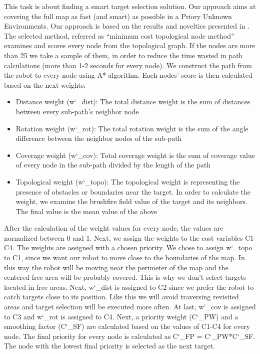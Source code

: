 \documentclass[letterpaper,12pt]{article}
\begin{document}

\vspace{2mm} %

This task is about finding a smart target selection solution. Our approach aims at covering the full map as fast (and smart) as possible in a Priory Unknown Environments. Our approach is based on the results and novelties presented in \cite{tsardoulias}. The selected method, referred as “minimum cost topological node method” examines and scores every node from the topological graph. If the nodes are more than 25 we take a sample of them, in order to reduce the time wasted in path calculations (more than 1-2 seconds for every node). We construct the path from the robot to every node using A* algorithm. Each nodes’ score is then calculated based on the next weights:

\begin{itemize}
	\item Distance weight (w\char`_dist): The total distance weight is the sum of distances between every sub-path’s neighbor node
	\item Rotation weight (w\char`_rot): The total rotation weight is the sum of the angle difference between the neighbor nodes of the sub-path
	\item Coverage weight (w\char`_cov): Total coverage weight is the sum of coverage value of every node in the sub-path divided by the length of the path
	\item Topological weight (w\char`_topo): The topological weight is representing the presence of obstacles or boundaries near the target. In order to calculate the weight, we examine the brushfire field value of the target and its neighbors. The final value is the mean value of the above
\end{itemize}

After the calculation of the weight values for every node, the values are normalized between 0 and 1. Next, we assign the weights to the cost variables C1-C4. The weights are assigned with a chosen priority. We chose to assign w\char`_topo to C1, since we want our robot to move close to the boundaries of the map. In this way the robot will be moving near the perimeter of the map and the centered free area will be probably covered. This is why we don't select targets located in free areas. Next, w\char`_dist is assigned to C2 since we prefer the robot to catch targets close to its position. Like this we will avoid traversing revisited areas and target selection will be executed more often. At last, w\char`_cov is assigned to C3 and w\char`_rot is assigned to C4. Next, a priority weight (C\char`_PW) and a smoothing factor (C\char`_SF) are calculated based on the values of C1-C4 for every node. The final priority for every node is calculated as C\char`_FP = C\char`_PW*C\char`_SF. The node with the lowest final priority is selected as the next target.
\end{document}
